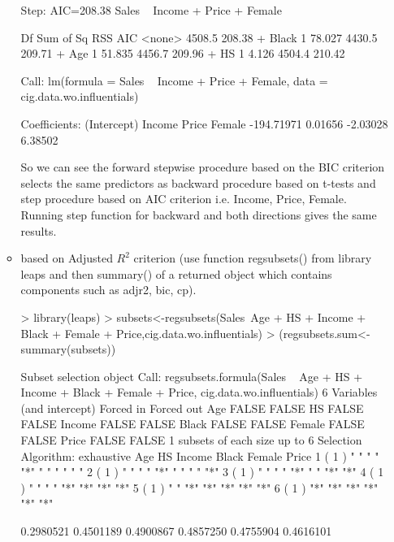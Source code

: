 \documentclass[a4paper]{article}
\begin{document}
\begin{itemize}
\begin{itemize}
\begin{Schunk}
\begin{Soutput}
Step:  AIC=208.38
Sales ~ Income + Price + Female

        Df Sum of Sq    RSS    AIC
<none>               4508.5 208.38
+ Black  1    78.027 4430.5 209.71
+ Age    1    51.835 4456.7 209.96
+ HS     1     4.126 4504.4 210.42

Call:
lm(formula = Sales ~ Income + Price + Female, data = cig.data.wo.influentials)

Coefficients:
(Intercept)       Income        Price       Female  
 -194.71971      0.01656     -2.03028      6.38502  
\end{Soutput}
\end{Schunk}
So we can see the forward stepwise procedure based on the BIC criterion selects
the same predictors as backward procedure based on t-tests and step procedure
based on AIC criterion i.e. Income, Price, Female.
Running step function for backward and both directions gives the same results.
\item based on Adjusted $R^2$ criterion (use function regsubsets() from library
leaps and then summary() of a returned object which contains components such as adjr2, bic, cp).
\begin{Schunk}
\begin{Sinput}
> library(leaps)	
> subsets<-regsubsets(Sales~Age + HS + Income + Black + Female + Price,cig.data.wo.influentials)
> (regsubsets.sum<-summary(subsets))
\end{Sinput}
\begin{Soutput}
Subset selection object
Call: regsubsets.formula(Sales ~ Age + HS + Income + Black + Female + 
    Price, cig.data.wo.influentials)
6 Variables  (and intercept)
       Forced in Forced out
Age        FALSE      FALSE
HS         FALSE      FALSE
Income     FALSE      FALSE
Black      FALSE      FALSE
Female     FALSE      FALSE
Price      FALSE      FALSE
1 subsets of each size up to 6
Selection Algorithm: exhaustive
         Age HS  Income Black Female Price
1  ( 1 ) " " " " "*"    " "   " "    " "  
2  ( 1 ) " " " " "*"    " "   " "    "*"  
3  ( 1 ) " " " " "*"    " "   "*"    "*"  
4  ( 1 ) " " " " "*"    "*"   "*"    "*"  
5  ( 1 ) " " "*" "*"    "*"   "*"    "*"  
6  ( 1 ) "*" "*" "*"    "*"   "*"    "*"  
\end{Soutput}
\begin{Soutput}
[1] 0.2980521 0.4501189 0.4900867 0.4857250 0.4755904 0.4616101
\end{Soutput}

\end{Schunk}
\end{itemize}
\end{itemize}
\end{document}

